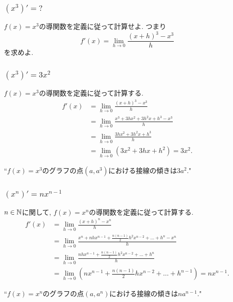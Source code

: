 
\begin{frame}
\frametitle{$(x^3)'=? $}


\begin{Prob}
$f(x)=x^3$の導関数を定義に従って計算せよ. 
つまり
$$
f'(x)  = \lim_{h\to 0} \frac{(x+h)^3-x^3}{h}
$$
を求めよ. 
\end{Prob}

\end{frame}





\begin{frame}
\frametitle{$(x^3)'=3x^2$}


$f(x)=x^3$の導関数を定義に従って計算する. 
\begin{align*}
f'(x) & = \lim_{h\to 0} \frac{(x+h)^3-x^3}{h} \\
& =  \lim_{h\to 0} \frac{x^3+3hx^2+3h^2x+h^3-x^3}{h} \\
& =  \lim_{h\to 0} \frac{3hx^2+3h^2x+h^3}{h} \\
& =  \lim_{h\to 0} (3x^2+3hx+h^2) =3x^2. 
\end{align*}

``$f(x)=x^3$のグラフの点$(a,a^3)$における接線の傾きは$3a^2$." 

\end{frame}




\begin{frame}
\frametitle{$(x^n)'=nx^{n-1}$}

$n \in \mathbb{N}$に関して, $f(x)=x^n$の導関数を定義に従って計算する. 
\begin{align*}
f'(x) & = \lim_{h\to 0} \frac{(x+h)^n-x^n}{h} \\
& =  \lim_{h\to 0} \frac{x^n+nhx^{n-1}+\frac{n(n-1)}{2}h^2x^{n-2}+\dots+h^n-x^n}{h} \\
& =  \lim_{h\to 0} \frac{nhx^{n-1}+\frac{n(n-1)}{2}h^2x^{n-2}+\dots+h^n}{h} \\
& =  \lim_{h\to 0} (nx^{n-1}+\frac{n(n-1)}{2}hx^{n-2}+\dots+h^{n-1}) =nx^{n-1}.  
\end{align*}

``$f(x)=x^n$のグラフの点$(a,a^n)$における接線の傾きは$na^{n-1}$." 

\end{frame}


